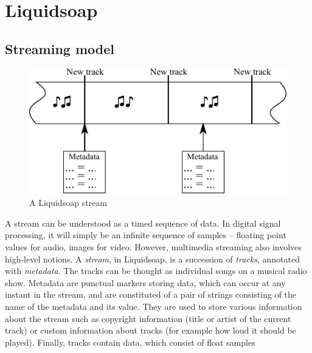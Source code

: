 \documentclass{llncs}
\newcommand{\liquidsoap}{Liquidsoap}
\newcommand{\TODO}[1]{\marginpar{\tiny #1}}
\newcommand{\fcaption}[1]{\vspace{-3ex}\caption{#1}\vspace{-4ex}}
\begin{document}

\section{Liquidsoap}
\label{sec:liq}
\subsection{Streaming model}
\label{sec:model}
\begin{figure}
  \vspace{-7.5ex}
  \begin{center}
    \includegraphics{stream}
  \end{center}
  \fcaption{A \liquidsoap{} stream}
  \label{fig:stream}
\end{figure}
A stream can be understood as a timed sequence of data.
In digital signal processing, it will simply be an infinite sequence of 
samples -- floating point values for audio, images for video.
However, multimedia streaming also involves high-level notions.
A \emph{stream}, in \liquidsoap{}, is a succession of \emph{tracks}, annotated
with \textit{metadata}. The tracks can be thought
as individual songs on a musical radio show. 
Metadata are punctual markers storing data, which can occur at any instant in the
stream, and are constituted of a pair of strings consisting of the name of
the metadata and its value. They are used to store various information about the
stream such as copyright information (title or artist of
the current track) or custom information about tracks (for example how loud it
should be played).
Finally, tracks contain data, which consist of float samples 
\end{document}
